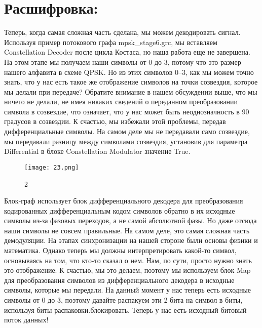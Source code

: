\documentclass[10pt,a4paper,oneside]{article}
\begin{document}
\section{Расшифровка:}

Теперь, когда самая сложная часть сделана, мы можем декодировать сигнал. Используя пример потокового графа mpsk_stage6.grc, мы вставляем Constellation Decoder после цикла Костаса, но наша работа еще не завершена. На этом этапе мы получаем наши символы от 0 до 3, потому что это размер нашего алфавита в схеме QPSK. Но из этих символов 0–3, как мы можем точно знать, что у нас есть такое же отображение символов на точки созвездия, которое мы делали при передаче? Обратите внимание в нашем обсуждении выше, что мы ничего не делали, не имея никаких сведений о переданном преобразовании символа в созвездие, что означает, что у нас может быть неоднозначность в 90 градусов в созвездии. К счастью, мы избежали этой проблемы, передав дифференциальные символы. На самом деле мы не передавали само созвездие, мы передавали разницу между символами созвездия, установив для параметра Differential в блоке Constellation Modulator значение True. 

\begin{figure}[H]
        \centering
        \texttt{[image: 23.png]}
        \caption{2}
        \label{fig:first}
\end{figure}

Блок-граф использует блок дифференциального декодера для преобразования кодированных дифференциальным кодом символов обратно в их исходные символы из-за фазовых переходов, а не самой абсолютной фазы. Но даже отсюда наши символы не совсем правильные. На самом деле, это самая сложная часть демодуляции. На этапах синхронизации на нашей стороне были основы физики и математика. Однако теперь мы должны интерпретировать какой-то символ, основываясь на том, что кто-то сказал о нем. Нам, по сути, просто нужно знать это отображение. К счастью, мы это делаем, поэтому мы используем блок Map для преобразования символов из дифференциального декодера в исходные символы, которые мы передали. На данный момент у нас теперь есть исходные символы от 0 до 3, поэтому давайте распакуем эти 2 бита на символ в биты, используя биты распаковки.блокировать. Теперь у нас есть исходный битовый поток данных!
\end{document}
